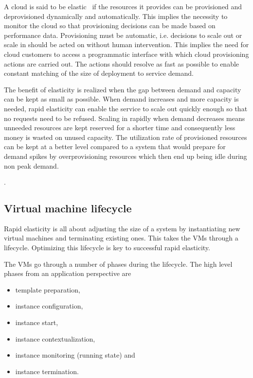 \documentclass[english]{tktltiki2}
\theoremstyle{definition}
\theoremstyle{remark}
\begin{document}
A cloud is said to be elastic~\cite{nistdefinition} if the resources it provides
can be provisioned and deprovisioned dynamically and automatically. This implies
the necessity to monitor the cloud so that provisioning decisions can be made
based on performance data. Provisioning must be automatic, i.e. decisions to
scale out or scale in should be acted on without human intervention. This
implies the need for cloud customers to access a programmatic interface with
which cloud provisioning actions are carried out. The actions should resolve as
fast as possible to enable constant matching of the size of deployment to
service demand.


The benefit of elasticity is realized when the gap between demand and capacity
can be kept as small as possible. When demand increases and more capacity is
needed, rapid elasticity can enable the service to scale out quickly enough so
that no requests need to be refused. Scaling in rapidly when demand decreases
means unneeded resources are kept reserved for a shorter time and consequently
less money is wasted on unused capacity. The utilization rate of provisioned
resources can be kept at a better level compared to a system that would prepare
for demand spikes by overprovisioning resources which then end up being idle
during non peak demand.

.

\subsection{Virtual machine lifecycle} \label{sec:VMLifeCycle}

Rapid elasticity is all about adjusting the size of a system by instantiating
new virtual machines and terminating existing ones. This takes the VMs through a
lifecycle. Optimizing this lifecycle is key to successful rapid elasticity.

The VMs go through a number of phases during the lifecycle. The high level
phases from an application perspective are

\begin{itemize}
\item template preparation,
\item instance configuration,
\item instance start,
\item instance contextualization,
\item instance monitoring (running state) and 
\item instance termination.
\end{itemize}
\end{document}
